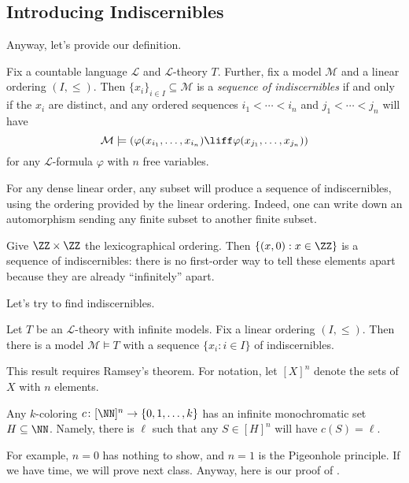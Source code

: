 \documentclass[../notes.tex]{subfiles}
\begin{document}
\subsection{Introducing Indiscernibles}
Anyway, let's provide our definition.
\begin{theorem}
	Fix a countable language $\mathcal L$ and $\mathcal L$-theory $T$. Further, fix a model $\mathcal M$ and a linear ordering $(I,\le)$. Then $\{x_i\}_{i\in I}\subseteq\mathcal M$ is a \textit{sequence of indiscernibles} if and only if the $x_i$ are distinct, and any ordered sequences $i_1<\cdots<i_n$ and $j_1<\cdots<j_n$ will have
	\[\mathcal M\models\left(\varphi(x_{i_1},\ldots,x_{i_n})\liff\varphi(x_{j_1},\ldots,x_{j_n})\right)\]
	for any $\mathcal L$-formula $\varphi$ with $n$ free variables.
\end{theorem}
\begin{example}
	For any dense linear order, any subset will produce a sequence of indiscernibles, using the ordering provided by the linear ordering. Indeed, one can write down an automorphism sending any finite subset to another finite subset.
\end{example}
\begin{example}
	Give $\ZZ\times\ZZ$ the lexicographical ordering. Then $\{(x,0):x\in\ZZ\}$ is a sequence of indiscernibles: there is no first-order way to tell these elements apart because they are already ``infinitely'' apart.
\end{example}
Let's try to find indiscernibles.
\begin{theorem} \label{thm:indisc-exist}
	Let $T$ be an $\mathcal L$-theory with infinite models. Fix a linear ordering $(I,\le)$. Then there is a model $\mathcal M\models T$ with a sequence $\{x_i:i\in I\}$ of indiscernibles.
\end{theorem}
This result requires Ramsey's theorem. For notation, let $[X]^n$ denote the sets of $X$ with $n$ elements.
\begin{theorem}[Ramsey] \label{thm:ramsey}
	Any $k$-coloring $c\colon[\NN]^n\to\{0,1,\ldots,k\}$ has an infinite monochromatic set $H\subseteq\NN$. Namely, there is $\ell$ such that any $S\in[H]^n$ will have $c(S)=\ell$.
\end{theorem}
For example, $n=0$ has nothing to show, and $n=1$ is the Pigeonhole principle. If we have time, we will prove  next class. Anyway, here is our proof of .
\end{document}
